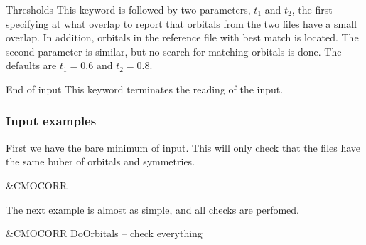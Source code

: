 \begin{keywordlist}
\item[Thresholds]
This keyword is followed by two parameters, $t_1$ and $t_2$, the first specifying at what overlap
to report that orbitals from the two files have a small overlap. In addition, orbitals in the reference
file with best match is located. The second parameter is similar, but no search for matching orbitals
is done. The defaults are $t_1=0.6$ and $t_2=0.8$.
\item[End of input]
This keyword terminates the reading of the input.
\end{keywordlist}
\subsubsection{Input examples}
First we have the bare minimum of input. This will only check that the files
have the same buber of orbitals and symmetries.

\begin{inputlisting}
 &CMOCORR
\end{inputlisting}

The next example is almost as simple, and all checks are perfomed.

\begin{inputlisting}
 &CMOCORR
DoOrbitals   -- check everything
\end{inputlisting}
